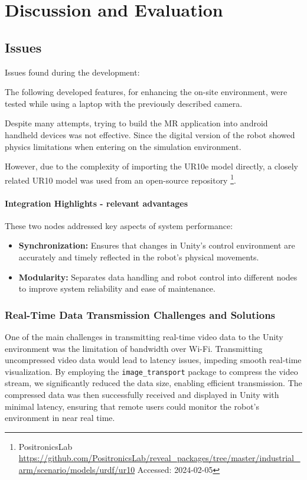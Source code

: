 \chapter{Discussion and Evaluation}
\section{Issues}
Issues found during the development:

The following developed features, for enhancing the on-site environment, were tested while using a laptop with the previously described camera.

    Despite many attempts, trying to build the \ac{MR} application into android handheld devices was not effective.
    Since the digital version of the robot showed physics limitations when entering on the simulation environment.


    However, due to the complexity of importing the UR10e model directly, a closely related UR10 model was used from an open-source repository \footnote{PositronicsLab \url{https://github.com/PositronicsLab/reveal_packages/tree/master/industrial_arm/scenario/models/urdf/ur10} Accessed: 2024-02-05}. 


    \subsubsection{Integration Highlights - relevant advantages}
    These two nodes addressed key aspects of system performance:
    \begin{itemize}
        \item \textbf{Synchronization:} Ensures that changes in Unity’s control environment are accurately and timely reflected in the robot's physical movements.
        \item \textbf{Modularity:} Separates data handling and robot control into different nodes to improve system reliability and ease of maintenance.
    \end{itemize}


    \subsection{Real-Time Data Transmission Challenges and Solutions}

    One of the main challenges in transmitting real-time video data to the Unity environment was the limitation of bandwidth over Wi-Fi. Transmitting uncompressed video data would lead to latency issues, impeding smooth real-time visualization. By employing the \texttt{image\_transport} package to compress the video stream, we significantly reduced the data size, enabling efficient transmission. The compressed data was then successfully received and displayed in Unity with minimal latency, ensuring that remote users could monitor the robot’s environment in near real time.


